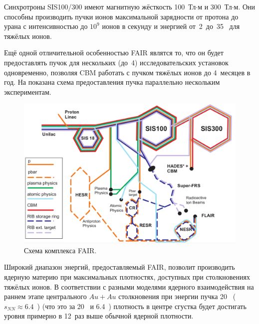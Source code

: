 Синхротроны SIS100/300 имеют магнитную жёсткость 100~Тл$\cdot$м и 300~Тл$\cdot$м. Они способны производить пучки ионов максимальной зарядности от протона до урана с интенсивностью до $10^9$ ионов в секунду и энергией от~2~до~35~\GeVperNucl{} для тяжёлых ионов.


Ещё одной отличительной особенностью FAIR являтся то, что он будет предоставлять пучок для нескольких (до~4) исследовательских установок одновременно, позволяя CBM работать с пучком тяжёлых ионов до 4~месяцев в год. На  показана схема предоставления пучка параллельно нескольким экспериментам.


\begin{figure}[H]
\includegraphics[width=1.0\textwidth]{pictures/FAIR_structure_3.png}
\caption{Схема комплекса FAIR.}
\label{fig:FAIRstructure3}
\end{figure}

Широкий диапазон энергий, предоставляемый FAIR, позволит производить ядерную материю при максимальных плотностях, доступных при столкновениях тяжёлых ионов. В соответствии с разными моделями ядерного взаимодействия на раннем этапе центрального $Au+Au$ столкновения при энергии пучка 20~\GeVperNucl{} ($s_{NN} \approx 6.4$~\GeV) \todo (что это за 20~\GeVperNucl{} и 6.4~\GeV) \todo плотность в центре сгустка будет достигать уровня примерно в 12~раз выше обычной ядерной плотности.

